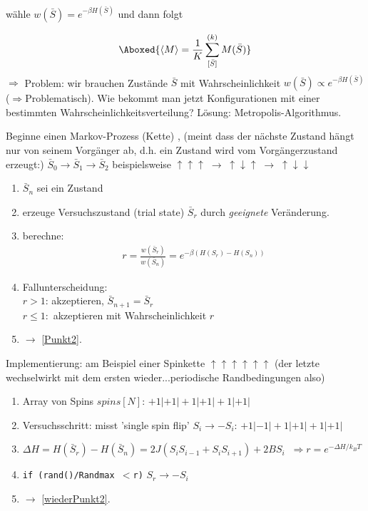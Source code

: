 \documentclass[12pt]{article}
\begin{document}
wähle $w(\bar{S})= e^{-\beta H(\bar{S})} $ und dann folgt

\begin{align}
\Aboxed{ \langle M \rangle = \frac{1}{K} \sum_{ [\bar{S}]}^{(k)} M(\bar{S})}
\end{align}
$\Rightarrow$ Problem: wir brauchen Zustände $\bar{S}$ mit Wahrscheinlichkeit $w(\bar{S})\propto e^{-\beta H(\bar{S})}$ ($\Rightarrow$Problematisch). Wie bekommt man jetzt Konfigurationen mit einer bestimmten Wahrscheinlichkeitsverteilung? 
Lösung: Metropolis-Algorithmus.

Beginne einen Markov-Prozess (Kette) , (meint dass der nächste Zustand hängt nur von seinem Vorgänger ab, d.h. ein Zustand wird vom Vorgängerzustand erzeugt:) $\bar{S}_0 \rightarrow \bar{S}_1 \rightarrow \bar{S}_2$
beispielsweise $\uparrow \uparrow \uparrow \; \rightarrow \; \uparrow \downarrow \uparrow \; \rightarrow \; \uparrow \downarrow \downarrow$
\begin{enumerate}
\item $\bar{S}_n $ sei ein Zustand
\item \label{Punkt2} erzeuge Versuchszustand (trial state) $\bar{S}_r$ durch \textit{geeignete} Veränderung.
\item berechne: 
\begin{align}
r= \frac{w(\bar{S}_r)}{w(\bar{S}_n)} = e^{-\beta (H(S_r)-H(S_n))}
\end{align}
\item Fallunterscheidung: \\ 
$r>1$: akzeptieren, $\bar{S}_{n+1} = \bar{S}_r$\\
$r \leq 1:$ akzeptieren mit Wahrscheinlichkeit $r$
\item  $\rightarrow$ \ref{Punkt2}.
\end{enumerate}
Implementierung: am Beispiel einer Spinkette $\uparrow \uparrow \uparrow \uparrow \uparrow \uparrow$ (der letzte wechselwirkt mit dem ersten wieder...periodische Randbedingungen also)
\begin{enumerate}
\item Array von Spins $spins[N]$: $ +1|+1|+1|+1|+1|+1|$
\item \label{wiederPunkt2} Versuchsschritt: misst 'single spin flip' $S_i \rightarrow - S_i$: $ +1|-1|+1|+1|+1|+1|$
\item $\Delta H= H(\bar{S}_r)  - H(\bar{S}_n) = 2 J (S_i S_{i-1} + S_i S_{i+1}) + 2BS_i \; \; \Rightarrow r= e^{-\Delta H / k_BT}$
\item \texttt{if (rand()/Randmax $<$r)} $S_r \rightarrow -S_i$
\item $\rightarrow$ \ref{wiederPunkt2}.
\end{enumerate}
\end{document}
